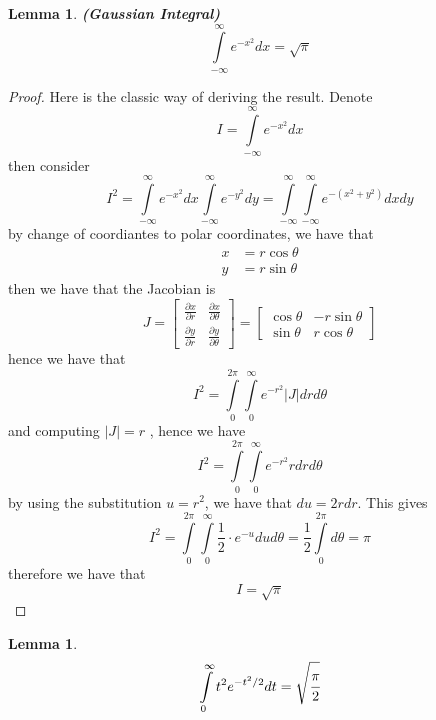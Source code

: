 \documentclass[a4 paper]{article}
\newcommand{\?}{\stackrel{?}{=}}
\newtheorem{lemma}[theorem]{Lemma}
\begin{document}
\begin{tcolorbox}[breakable]
\begin{lemma}
\textbf{(Gaussian Integral)} 
$$ \int\limits_{-\infty}^{\infty} e^{-x^2}dx = \sqrt{\pi}  $$
\end{lemma}
\end{tcolorbox}

\begin{tcolorbox}[breakable,colback=blue!5!white, colframe=blue!50!black]
\begin{proof}
Here is the classic way of deriving the result. Denote 
$$ I = \int\limits_{-\infty}^{\infty} e^{-x^2}d x  $$
then consider 
$$ I^2 = \int\limits_{-\infty }^{\infty} e^{-x^2} dx \int\limits_{-\infty}^{\infty} e^{-y^2} dy = \int\limits_{-\infty }^{\infty} \int\limits_{-\infty}^{\infty} e^{- (x^2 +y^2 )} dx dy    $$
by change of coordiantes to polar coordinates, we have that 
\begin{align*}
    x & = r \cos \theta  \\ 
    y & = r \sin \theta
\end{align*}
then we have that the Jacobian is 
$$ J = \begin{bmatrix}
\frac{\partial x}{\partial r} & \frac{\partial x}{\partial \theta} \\ 
\frac{\partial y}{\partial r} & \frac{\partial y}{\partial \theta}
\end{bmatrix} = \begin{bmatrix}
\cos \theta & - r \sin \theta \\ 
\sin \theta & r \cos \theta
\end{bmatrix}
 $$
 hence we have that 
 $$ I^2  = \int\limits_{0}^{2 \pi } \int\limits_{0}^{\infty} e^{- r^2} |J| dr d \theta   $$
 and computing $ |J| = r $ , hence we have 
 $$ I^2 = \int\limits_{0 }^{2 \pi } \int\limits_{0}^{\infty} e^{-r^2} r dr d \theta  $$
by using the substitution $ u = r^2 $, we have that  $ du = 2 r dr $. This gives 
$$ I^2 = \int\limits_{0}^{2 \pi } \int\limits_{0}^{\infty}   \frac{1}{2} \cdot e^{-u} du d \theta = \frac{1}{2} \int\limits_{0}^{2 \pi } d \theta = \pi    $$
therefore we have that 
$$ I = \sqrt{\pi } $$
\end{proof}
\end{tcolorbox}

\begin{tcolorbox}[breakable]
\begin{lemma}
$$ \int\limits_{0}^{\infty} t^2 e^{- t^2 /2 } dt = \sqrt{\cfrac{\pi }{2} } $$

\end{lemma}
\end{tcolorbox}
\end{document}
